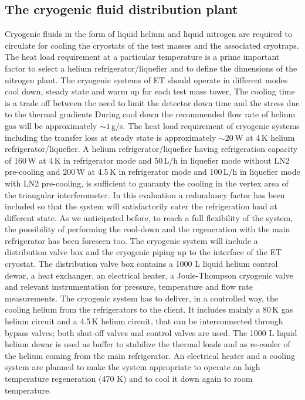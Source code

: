 \subsection{The cryogenic fluid distribution plant}
\label{subsec:cryo_distr_plant}
Cryogenic fluids in the form of liquid helium and liquid nitrogen are required to circulate for cooling the cryostats of the test masses and the associated cryotraps. The heat load requirement at a particular temperature is a prime important factor to select a helium refrigerator/liquefier and to define the dimensions of the nitrogen plant. The cryogenic systems of ET should operate in different modes cool down, steady state and warm up for each test mass tower, The cooling time is a trade off between the need to limit the detector down time and the stress due to the thermal gradients During cool down the recommended flow rate of helium gas will be approximately $\sim 1$\,g/s. The heat load requirement of cryogenic systems including the transfer loss at steady state is approximately $\sim 20$\,W at 4\,K helium refrigerator/liquefier. A helium refrigerator/liquefier having refrigeration capacity of 160\,W at 4\,K in refrigerator mode and 50\,L/h in liquefier mode without LN2 pre-cooling and 200\,W at 4.5\,K in refrigerator mode and 100\,L/h in liquefier mode with LN2 pre-cooling, is sufficient to guaranty the cooling in the vertex area of the triangular interferometer. In this evaluation a redundancy factor has been included so that the system will satisfactorily cater the refrigeration load at different state. As we anticipated before, to reach a full flexibility of the system, the possibility of performing the cool-down and the regeneration with the main refrigerator has been foreseen too. The cryogenic system will include a distribution valve box and the cryogenic piping up to the interface of the ET cryostat. The distribution valve box contains a 1000 L liquid helium control dewar, a heat exchanger, an electrical heater, a Joule-Thompson cryogenic valve and relevant instrumentation for pressure, temperature and flow rate measurements. The cryogenic system has to deliver, in a controlled way, the cooling helium from the refrigerators to the client. It includes mainly a 80\,K gas helium circuit and a 4.5\,K helium circuit, that can be interconnected through bypass valves; both shut-off valves and control valves are used. The 1000 L liquid helium dewar is used as buffer to stabilize the thermal loads and as re-cooler of the helium coming from the main refrigerator. An electrical heater and a cooling system are planned to make the system appropriate to operate an high temperature regeneration (470 K) and to cool it down again to room temperature. 

